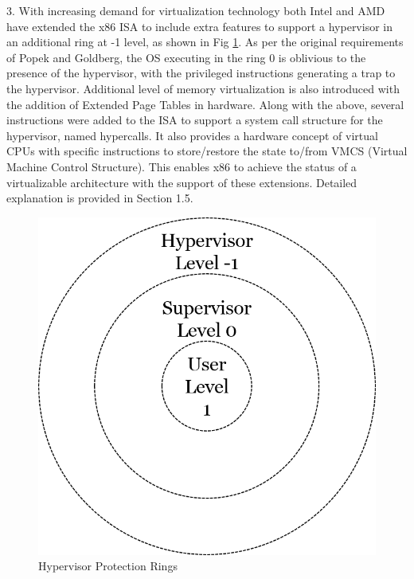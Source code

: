 3. With increasing demand for virtualization technology both Intel and AMD have extended the x86 ISA to include extra features to support a hypervisor in an additional ring at -1 level, as shown in Fig \ref{fig:hyper_rings}. As per the original requirements of Popek and Goldberg, the OS executing in the ring 0 is oblivious to the presence of the hypervisor, with the privileged instructions generating a trap to the hypervisor. Additional level of memory virtualization is also introduced with the addition of Extended Page Tables in hardware. Along with the above, several instructions were added to the ISA to support a system call structure for the hypervisor, named hypercalls. It also provides a hardware concept of virtual CPUs with specific instructions to store/restore the state to/from VMCS (Virtual Machine Control Structure). This enables x86 to achieve the status of a virtualizable architecture with the support of these extensions. Detailed explanation is provided in Section 1.5. 

\setlength{\belowcaptionskip}{-10pt}

\begin{figure}[H]
  \centering
  \includegraphics[scale=0.6]{figures/protect_hyper.png}
  \caption{Hypervisor Protection Rings}
  \label{fig:hyper_rings}
\end{figure}

